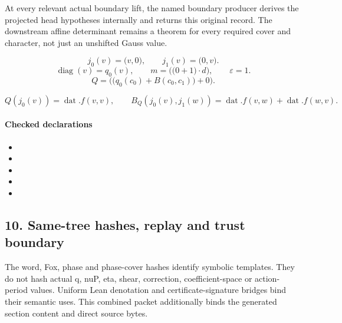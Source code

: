 At every relevant actual boundary lift, the named boundary producer derives the projected head hypotheses internally and returns this original record. The downstream affine determinant remains a theorem for every required cover and character, not just an unshifted Gauss value.

\[j_0(v)=\bigl(v,0\bigr),\qquad j_1(v)=\bigl(0,v\bigr).\]
\[\operatorname{diag}(v)=q_0(v),\qquad m=\bigl(\bigl(0+1\bigr)\cdot d\bigr),\qquad \varepsilon=1.\]
\[Q=\bigl(\bigl(q_0(c_0)+B(c_0,c_1)\bigr)+0\bigr).\]

\[Q(j_0(v))=\operatorname{dat}.f(v,v),\qquad B_Q(j_0(v),j_1(w))=\operatorname{dat}.f(v,w)+\operatorname{dat}.f(w,v).\]
\paragraph{Checked declarations}
\begin{itemize}
\item {}
\item {}
\item {}
\item {}
\item {}
\end{itemize}

\subsection*{10. Same-tree hashes, replay and trust boundary}
The word, Fox, phase and phase-cover hashes identify symbolic templates. They do not hash actual q, nuP, eta, shear, correction, coefficient-space or action-period values. Uniform Lean denotation and certificate-signature bridges bind their semantic uses. This combined packet additionally binds the generated section content and direct source bytes.

